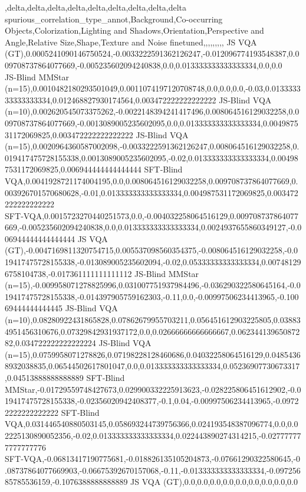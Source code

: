 ,delta,delta,delta,delta,delta,delta,delta,delta,delta
spurious_correlation_type_annot,Background,Co-occurring Objects,Colorization,Lighting and Shadows,Orientation,Perspective and Angle,Relative Size,Shape,Texture and Noise
finetuned,,,,,,,,,
 JS VQA (GT),0.0005241090146750524,-0.0033222591362126247,-0.012096774193548387,0.009708737864077669,-0.005235602094240838,0.0,0.013333333333333334,0.0,0.0
 JS‑Blind MMStar (n=15),0.0010482180293501049,0.0011074197120708748,0.0,0.0,0.0,-0.03,0.013333333333333334,0.012468827930174564,0.003472222222222222
 JS‑Blind VQA (n=10),0.002620545073375262,-0.0022148394241417496,0.008064516129032258,0.009708737864077669,-0.0013089005235602095,0.0,0.013333333333333334,0.004987531172069825,0.003472222222222222
 JS‑Blind VQA (n=15),0.0020964360587002098,-0.0033222591362126247,0.008064516129032258,0.019417475728155338,0.0013089005235602095,-0.02,0.013333333333333334,0.004987531172069825,0.006944444444444444
 SFT‑Blind VQA,0.0041928721174004195,0.0,0.008064516129032258,0.009708737864077669,0.003926701570680628,-0.01,0.013333333333333334,0.004987531172069825,0.003472222222222222
 SFT‑VQA,0.0015723270440251573,0.0,-0.004032258064516129,0.009708737864077669,-0.005235602094240838,0.0,0.013333333333333334,0.0024937655860349127,-0.006944444444444444
 JS VQA (GT),-0.0047169811320754715,0.005537098560354375,-0.008064516129032258,-0.019417475728155338,-0.013089005235602094,-0.02,0.05333333333333334,0.007481296758104738,-0.017361111111111112
 JS‑Blind MMStar (n=15),-0.009958071278825996,0.031007751937984496,-0.036290322580645164,-0.019417475728155338,-0.014397905759162303,-0.11,0.0,-0.00997506234413965,-0.10069444444444445
 JS‑Blind VQA (n=10),0.08280922431865828,0.07862679955703211,0.056451612903225805,0.038834951456310676,0.07329842931937172,0.0,0.02666666666666667,0.06234413965087282,0.034722222222222224
 JS‑Blind VQA (n=15),0.0759958071278826,0.07198228128460686,0.04032258064516129,0.04854368932038835,0.06544502617801047,0.0,0.013333333333333334,0.05236907730673317,0.04513888888888889
 SFT‑Blind MMStar,-0.01729559748427673,0.029900332225913623,-0.028225806451612902,-0.019417475728155338,-0.02356020942408377,-0.1,0.04,-0.00997506234413965,-0.09722222222222222
 SFT‑Blind VQA,0.031446540880503145,0.058693244739756366,0.024193548387096774,0.0,0.02225130890052356,-0.02,0.013333333333333334,0.022443890274314215,-0.027777777777777776
 SFT‑VQA,-0.06813417190775681,-0.018826135105204873,-0.07661290322580645,-0.08737864077669903,-0.06675392670157068,-0.11,-0.013333333333333334,-0.09725685785536159,-0.1076388888888889
 JS VQA (GT),0.0,0.0,0.0,0.0,0.0,0.0,0.0,0.0,0.0
